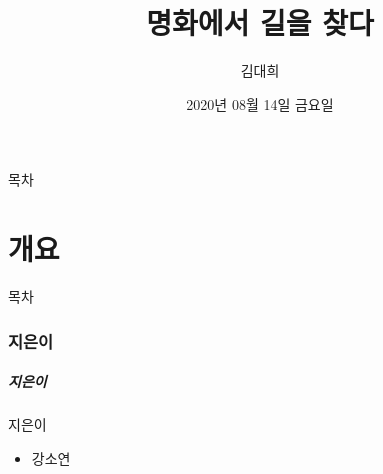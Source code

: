 \documentclass[aspectratio=1610,12pt,xcolor=pdftex,dvipsnames,table,handout]{beamer}
\begin{document}
	

			\title{ 명화에서 길을 찾다 }
			\author{ 김대희 }
			\date{ 2020년 
					08월 
					14일 
					금요일 }


%
%
%
%


		\begin{frame}[plain]
		\titlepage
		\end{frame}


		\begin{frame} [plain]{목차}
		\tableofcontents%
		\end{frame}



		\part{개요}
		\frame{\partpage}

		\begin{frame} [plain]{목차}
		\tableofcontents%
		\end{frame}
		

		\section{지은이}
		\begin{frame} [t,plain]
		\frametitle{지은이}
			\begin{block} {지은이}
			\setlength{\leftmargini}{5em}			
			\begin{itemize}
				\item [지은이] 강소연
			\end{itemize}
			\end{block}						

		\end{frame}						
		

\end{document}
